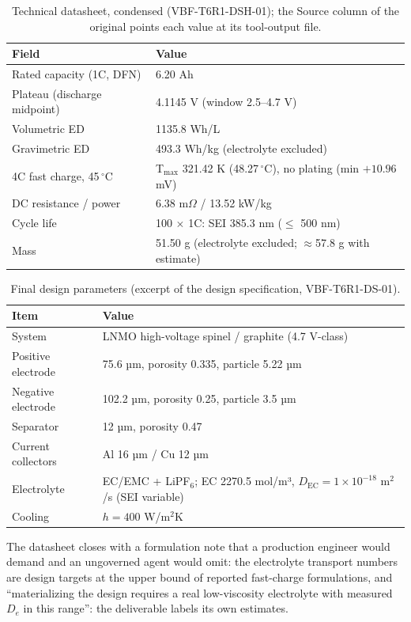 \documentclass[review,11pt]{elsarticle}
\begin{document}
\begin{table}[!ht]
\centering
\caption{Technical datasheet, condensed (VBF-T6R1-DSH-01); the Source
column of the original points each value at its tool-output file.}
\label{supp:tab:datasheet}
\setlength{\tabcolsep}{2.5pt}
\begin{tabular}{p{2.9cm}p{8.2cm}}
\toprule
Field & Value \\
\midrule
Rated capacity (1C, DFN) & 6.20 Ah \\
Plateau (discharge midpoint) & 4.1145 V (window 2.5--4.7 V) \\
Volumetric ED & 1135.8 Wh/L \\
Gravimetric ED & 493.3 Wh/kg (electrolyte excluded) \\
4C fast charge, 45$\,^\circ$C & T$_{\max}$ 321.42 K (48.27$\,^\circ$C), no plating (min $+10.96$ mV) \\
DC resistance / power & 6.38 m$\Omega$ / 13.52 kW/kg \\
Cycle life & 100 $\times$ 1C: SEI 385.3 nm ($\leq$ 500 nm) \\
Mass & 51.50 g (electrolyte excluded; $\approx$57.8 g with estimate) \\
\bottomrule
\end{tabular}
\end{table}

\begin{table}[!ht]
\centering
\caption{Final design parameters (excerpt of the design specification,
VBF-T6R1-DS-01).}
\label{supp:tab:designparams}
\setlength{\tabcolsep}{2.5pt}
\begin{tabular}{p{2.4cm}p{8.7cm}}
\toprule
Item & Value \\
\midrule
System & LNMO high-voltage spinel / graphite (4.7 V-class) \\
Positive electrode & 75.6 µm, porosity 0.335, particle 5.22 µm \\
Negative electrode & 102.2 µm, porosity 0.25, particle 3.5 µm \\
Separator & 12 µm, porosity 0.47 \\
Current collectors & Al 16 µm / Cu 12 µm \\
Electrolyte & EC/EMC + LiPF$_6$; EC 2270.5 mol/m³, $D_{\mathrm{EC}}=1\times10^{-18}$ m$^2$/s (SEI variable) \\
Cooling & $h = 400$ W/m$^2$K \\
\bottomrule
\end{tabular}
\end{table}

The datasheet closes with a formulation note that a production engineer
would demand and an ungoverned agent would omit: the electrolyte transport
numbers are design targets at the upper bound of reported fast-charge
formulations, and ``materializing the design requires a real
low-viscosity electrolyte with measured $D_e$ in this range'': the
deliverable labels its own estimates.
\end{document}
